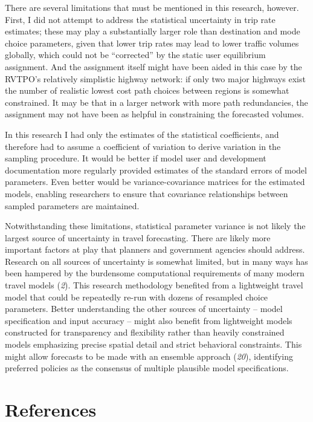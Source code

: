 \documentclass[
  letterpaper,
]{trb}
\begin{document}
There are several limitations that must be mentioned in this research,
however. First, I did not attempt to address the statistical uncertainty
in trip rate estimates; these may play a substantially larger role than
destination and mode choice parameters, given that lower trip rates may
lead to lower traffic volumes globally, which could not be ``corrected''
by the static user equilibrium assignment. And the assignment itself
might have been aided in this case by the RVTPO's relatively simplistic
highway network: if only two major highways exist the number of
realistic lowest cost path choices between regions is somewhat
constrained. It may be that in a larger network with more path
redundancies, the assignment may not have been as helpful in
constraining the forecasted volumes.

In this research I had only the estimates of the statistical
coefficients, and therefore had to assume a coefficient of variation to
derive variation in the sampling procedure. It would be better if model
user and development documentation more regularly provided estimates of
the standard errors of model parameters. Even better would be
variance-covariance matrices for the estimated models, enabling
researchers to ensure that covariance relationships between sampled
parameters are maintained.

Notwithstanding these limitations, statistical parameter variance is not
likely the largest source of uncertainty in travel forecasting. There
are likely more important factors at play that planners and government
agencies should address. Research on all sources of uncertainty is
somewhat limited, but in many ways has been hampered by the burdensome
computational requirements of many modern travel models (\emph{2}). This
research methodology benefited from a lightweight travel model that
could be repeatedly re-run with dozens of resampled choice parameters.
Better understanding the other sources of uncertainty -- model
specification and input accuracy -- might also benefit from lightweight
models constructed for transparency and flexibility rather than heavily
constrained models emphasizing precise spatial detail and strict
behavioral constraints. This might allow forecasts to be made with an
ensemble approach (\emph{20}), identifying preferred policies as the
consensus of multiple plausible model specifications.


\hypertarget{references}{%
\section*{References}\label{references}}
\end{document}
